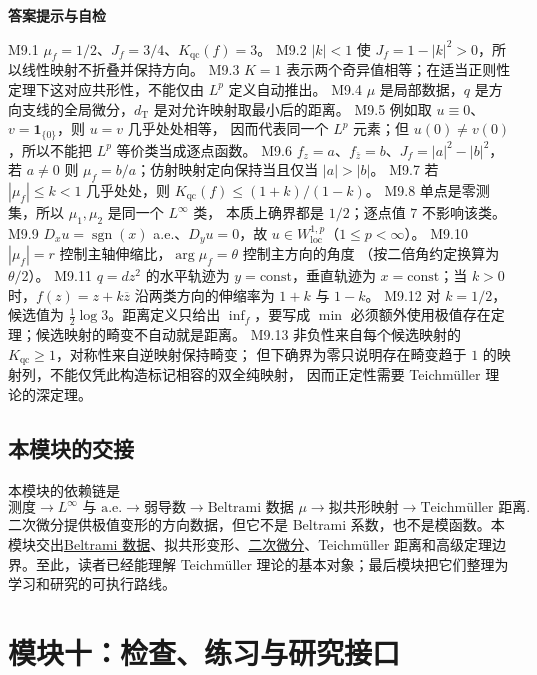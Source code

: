 \documentclass[UTF8,fontset=none,a4paper,11pt]{ctexart}
\theoremstyle{foundation-definition}
\theoremstyle{foundation-theorem}
\theoremstyle{foundation-proposition}
\theoremstyle{foundation-example}
\theoremstyle{foundation-remark}
\theoremstyle{foundation-theorem}
\newcommand{\term}[2]{\hyperref[#1]{#2}}
\newenvironment{answerkey}{%
\begin{mdframed}[backgroundcolor=examplebg,linecolor=examplepurple,linewidth=1.0pt,
  leftline=true,rightline=false,topline=false,bottomline=false,
  skipabove=7pt,skipbelow=8pt,innerleftmargin=10pt,innerrightmargin=8pt,
  innertopmargin=6pt,innerbottommargin=6pt]
{\sffamily\bfseries\color{examplepurple}答案提示与自检}\par\smallskip\small
}{\end{mdframed}}
\begin{document}
\begin{answerkey}
M9.1 \(\mu_f=1/2\)、\(J_f=3/4\)、\(K_{\mathrm{qc}}(f)=3\)。
M9.2 \(|k|<1\) 使 \(J_f=1-|k|^2>0\)，所以线性映射不折叠并保持方向。
M9.3 \(K=1\) 表示两个奇异值相等；在适当正则性定理下这对应共形性，不能仅由 \(L^p\) 定义自动推出。
M9.4 \(\mu\) 是局部数据，\(q\) 是方向支线的全局微分，\(d_{\mathrm T}\) 是对允许映射取最小后的距离。
M9.5 例如取 \(u\equiv0\)、\(v=\mathbf 1_{\{0\}}\)，则 \(u=v\) 几乎处处相等，
    因而代表同一个 \(L^p\) 元素；但 \(u(0)\ne v(0)\)，所以不能把 \(L^p\) 等价类当成逐点函数。
M9.6 \(f_z=a\)、\(f_{\overline z}=b\)、\(J_f=|a|^2-|b|^2\)，若 \(a\ne0\) 则
    \(\mu_f=b/a\)；仿射映射定向保持当且仅当 \(|a|>|b|\)。
M9.7 若 \(|\mu_f|\le k<1\) 几乎处处，则
    \(K_{\mathrm{qc}}(f)\le(1+k)/(1-k)\)。
M9.8 单点是零测集，所以 \(\mu_1,\mu_2\) 是同一个 \(L^\infty\) 类，
    本质上确界都是 \(1/2\)；逐点值 \(7\) 不影响该类。
M9.9 \(D_xu=\operatorname{sgn}(x)\) a.e.、\(D_yu=0\)，故
    \(u\in W^{1,p}_{\mathrm{loc}}\)（\(1\le p<\infty\)）。
M9.10 \(|\mu_f|=r\) 控制主轴伸缩比，\(\arg\mu_f=\theta\) 控制主方向的角度
    （按二倍角约定换算为 \(\theta/2\)）。
M9.11 \(q=dz^2\) 的水平轨迹为 \(y=\mathrm{const}\)，垂直轨迹为
    \(x=\mathrm{const}\)；当 \(k>0\) 时，\(f(z)=z+k\overline z\) 沿两类方向的伸缩率为
    \(1+k\) 与 \(1-k\)。
M9.12 对 \(k=1/2\)，候选值为 \(\frac12\log3\)。距离定义只给出
    \(\inf_f\)，要写成 \(\min\) 必须额外使用极值存在定理；候选映射的畸变不自动就是距离。
M9.13 非负性来自每个候选映射的 \(K_{\mathrm{qc}}\geq1\)，对称性来自逆映射保持畸变；
    但下确界为零只说明存在畸变趋于 \(1\) 的映射列，不能仅凭此构造标记相容的双全纯映射，
    因而正定性需要 Teichmüller 理论的深定理。
\end{answerkey}

\subsection{本模块的交接}

本模块的依赖链是
\[
\text{测度}
\longrightarrow
L^\infty\text{ 与 a.e.}
\longrightarrow
\text{弱导数}
\longrightarrow
\text{Beltrami 数据 }\mu
\longrightarrow
\text{拟共形映射}
\longrightarrow
\text{Teichmüller 距离}.
\]
二次微分提供极值变形的方向数据，但它不是 Beltrami 系数，也不是模函数。本模块交出\term{def:beltrami}{Beltrami 数据}、拟共形变形、\term{def:quadratic-differential}{二次微分}、Teichmüller 距离和高级定理边界。至此，读者已经能理解 Teichmüller 理论的基本对象；最后模块把它们整理为学习和研究的可执行路线。

\clearpage
\section{模块十：检查、练习与研究接口}
\end{document}

